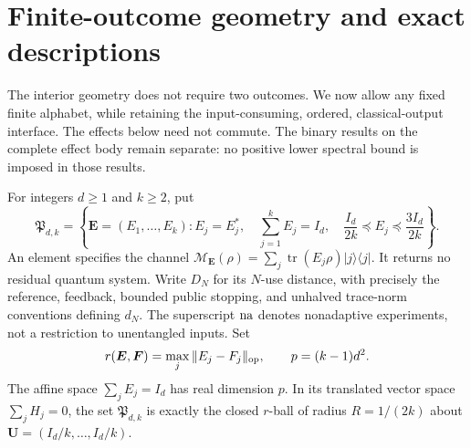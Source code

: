 \section{Finite-outcome geometry and exact descriptions}
\label{sec:finiteoutcome82}

The interior geometry does not require two outcomes.  We now allow any
fixed finite alphabet, while retaining the input-consuming, ordered,
classical-output interface.  The effects below need not commute.
The binary results on the complete effect body remain separate: no
positive lower spectral bound is imposed in those results.

For integers $d\ge1$ and $k\ge2$, put
\begin{equation}\label{eq:balancedbody82}
 \mathfrak P_{d,k}=\left\{\boldsymbol E=(E_1,\ldots,E_k):
 E_j=E_j^*,\quad \sum_{j=1}^k E_j=I_d,\quad
 \frac{I_d}{2k}\preceq E_j\preceq\frac{3I_d}{2k}\right\}.
\end{equation}
An element specifies the channel
$\mathcal M_{\boldsymbol E}(\rho)
=\sum_j\operatorname{tr}(E_j\rho)|j\rangle\langle j|$.
It returns no residual quantum system.  Write $D_N$ for its
$N$-use distance, with precisely the reference, feedback, bounded
public stopping, and unhalved trace-norm conventions defining $d_N$.
The superscript ${\rm na}$ denotes nonadaptive experiments, not a
restriction to unentangled inputs.  Set
\[
 r(\boldsymbol E,\boldsymbol F)=\max_j\|E_j-F_j\|_{\rm op},
 \qquad p=(k-1)d^2.
\]
The affine space $\sum_j E_j=I_d$ has real dimension $p$.
In its translated vector space $\sum_j H_j=0$, the set
$\mathfrak P_{d,k}$ is exactly the closed $r$-ball of radius
$R=1/(2k)$ about $\boldsymbol U=(I_d/k,\ldots,I_d/k)$.

